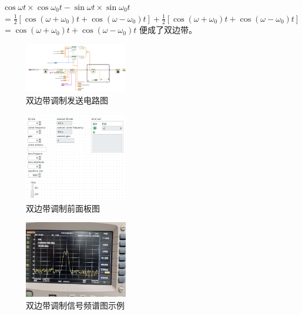 \documentclass{../source/Experiment}
\begin{document}
        $\cos \omega t \times \cos \omega_{0} t-\sin \omega t \times \sin \omega_{0} t$
        $=\frac{1}{2}\left[\cos \left(\omega+\omega_{0}\right) t+\cos \left(\omega-\omega_{0}\right) t\right]+\frac{1}{2}\left[\cos \left(\omega+\omega_{0}\right) t+\cos \left(\omega-\omega_{0}\right) t\right]$
        $=\cos \left(\omega+\omega_{0}\right) t+\cos \left(\omega-\omega_{0}\right) t$
        便成了双边带。

        \begin{figure}[H]
            \centering
            \includegraphics[width = 0.4\textwidth]{lab9/double-side_IQ-a.jpg}
            \caption{双边带调制发送电路图}
        \end{figure}
        \begin{figure}[H]
            \centering
            \includegraphics[width = 0.4\textwidth]{lab9/double-side_IQ-b.jpg}
            \caption{双边带调制前面板图}
        \end{figure}
        
        \begin{figure}[H]
            \centering
            \includegraphics[width = 0.4\textwidth,angle=180]{lab9/7.jpg}
            \caption{双边带调制信号频谱图示例}
        \end{figure}
\end{document}
